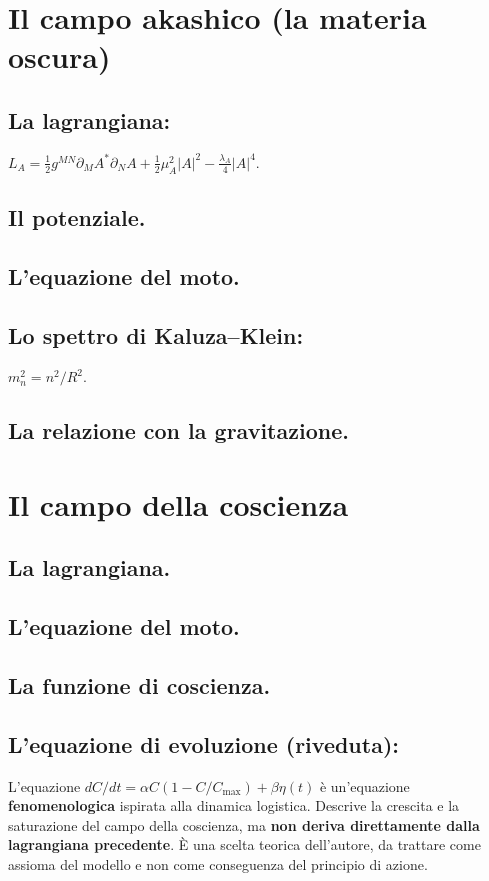 \documentclass[11pt,a4paper]{article}
\begin{document}
\section{Il campo akashico (la materia oscura)}
\subsection{La lagrangiana:} $L_A = \frac{1}{2} g^{MN} \partial_M A^* \partial_N A + \frac{1}{2} \mu_A^2 |A|^2 - \frac{\lambda_A}{4} |A|^4$.
\subsection{Il potenziale.}
\subsection{L'equazione del moto.}
\subsection{Lo spettro di Kaluza--Klein:} $m_n^2 = n^2/R^2$.
\subsection{La relazione con la gravitazione.}

\section{Il campo della coscienza}
\subsection{La lagrangiana.}
\subsection{L'equazione del moto.}
\subsection{La funzione di coscienza.}
\subsection{L'equazione di evoluzione (riveduta):} L'equazione $dC/dt = \alpha C (1 - C/C_{\text{max}}) + \beta \eta(t)$ è un'equazione \textbf{fenomenologica} ispirata alla dinamica logistica. Descrive la crescita e la saturazione del campo della coscienza, ma \textbf{non deriva direttamente dalla lagrangiana precedente}. È una scelta teorica dell'autore, da trattare come assioma del modello e non come conseguenza del principio di azione.
\end{document}

